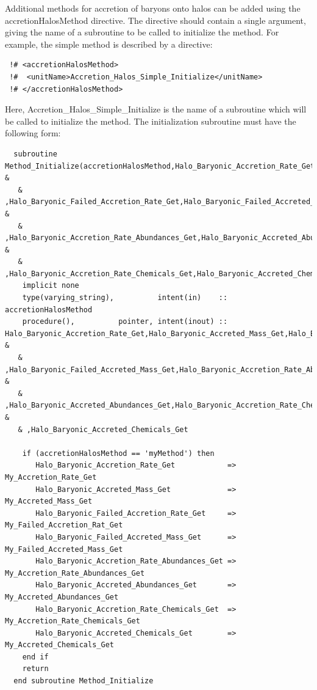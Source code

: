 Additional methods for accretion of baryons onto halos can be added using the {\normalfont \ttfamily accretionHalosMethod} directive. The directive should contain a single argument, giving the name of a subroutine to be called to initialize the method. For example, the {\normalfont \ttfamily simple} method is described by a directive:
\begin{verbatim}
 !# <accretionHalosMethod>
 !#  <unitName>Accretion_Halos_Simple_Initialize</unitName>
 !# </accretionHalosMethod>
\end{verbatim}
Here, {\normalfont \ttfamily Accretion\_Halos\_Simple\_Initialize} is the name of a subroutine which will be called to initialize the method. The initialization subroutine must have the following form:
\begin{verbatim}
  subroutine Method_Initialize(accretionHalosMethod,Halo_Baryonic_Accretion_Rate_Get,Halo_Baryonic_Accreted_Mass_Get &
   & ,Halo_Baryonic_Failed_Accretion_Rate_Get,Halo_Baryonic_Failed_Accreted_Mass_Get &
   & ,Halo_Baryonic_Accretion_Rate_Abundances_Get,Halo_Baryonic_Accreted_Abundances_Get, &
   & ,Halo_Baryonic_Accretion_Rate_Chemicals_Get,Halo_Baryonic_Accreted_Chemicals_Get)
    implicit none
    type(varying_string),          intent(in)    :: accretionHalosMethod
    procedure(),          pointer, intent(inout) :: Halo_Baryonic_Accretion_Rate_Get,Halo_Baryonic_Accreted_Mass_Get,Halo_Baryonic_Failed_Accretion_Rate_Get &
   & ,Halo_Baryonic_Failed_Accreted_Mass_Get,Halo_Baryonic_Accretion_Rate_Abundances_Get &
   & ,Halo_Baryonic_Accreted_Abundances_Get,Halo_Baryonic_Accretion_Rate_Chemicals_Get &
   & ,Halo_Baryonic_Accreted_Chemicals_Get
    
    if (accretionHalosMethod == 'myMethod') then
       Halo_Baryonic_Accretion_Rate_Get            => My_Accretion_Rate_Get
       Halo_Baryonic_Accreted_Mass_Get             => My_Accreted_Mass_Get
       Halo_Baryonic_Failed_Accretion_Rate_Get     => My_Failed_Accretion_Rat_Get
       Halo_Baryonic_Failed_Accreted_Mass_Get      => My_Failed_Accreted_Mass_Get
       Halo_Baryonic_Accretion_Rate_Abundances_Get => My_Accretion_Rate_Abundances_Get
       Halo_Baryonic_Accreted_Abundances_Get       => My_Accreted_Abundances_Get
       Halo_Baryonic_Accretion_Rate_Chemicals_Get  => My_Accretion_Rate_Chemicals_Get
       Halo_Baryonic_Accreted_Chemicals_Get        => My_Accreted_Chemicals_Get
    end if
    return
  end subroutine Method_Initialize
\end{verbatim}
